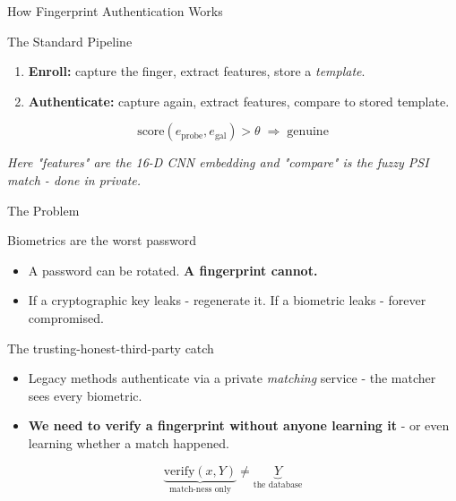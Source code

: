 \documentclass{beamer}
\begin{document}
\begin{frame}{How Fingerprint Authentication Works}
  \begin{block}{The Standard Pipeline}
    \begin{enumerate}
      \item \textbf{Enroll:} capture the finger, extract features, store a \emph{template}.
      \item \textbf{Authenticate:} capture again, extract features, compare to stored template.
    \end{enumerate}
  \end{block}
  
  \vspace{0.2cm}
  \centering
  \vspace{0.2cm}
  
  \[
    \text{score}(e_{\text{probe}}, e_{\text{gal}}) > \theta \;\Longrightarrow\; \text{genuine}
  \]
  
  \vspace{0.2cm}
  {\small\emph{Here "features" are the 16-D CNN embedding and "compare" is the fuzzy PSI match - done in private.}}
\end{frame}

\begin{frame}{The Problem}
  \begin{block}{Biometrics are the worst password}
    \begin{itemize}
      \item A password can be rotated. \textbf{A fingerprint cannot.}
      \item If a cryptographic key leaks - regenerate it. If a biometric leaks - \alert{forever compromised}.
    \end{itemize}
  \end{block}
  \begin{block}{The trusting-honest-third-party catch}
    \begin{itemize}
      \item Legacy methods authenticate via a private \emph{matching} service - the matcher sees every biometric.
      \item \textbf{We need to verify a fingerprint without anyone learning it} - or even learning whether a match happened.
    \end{itemize}
  \end{block}
  \[
    \underbrace{\text{verify}(x, Y)}_{\text{match-ness only}} \neq \underbrace{Y}_{\text{the database}}
  \]
\end{frame}
\end{document}

